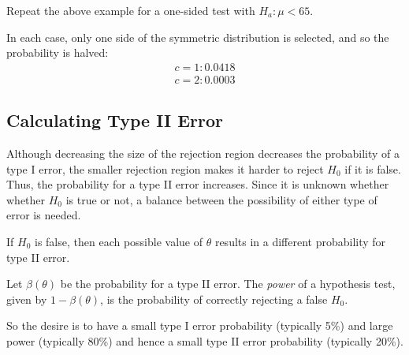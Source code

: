 \documentclass[letterpaper,12pt,fleqn]{article}
\renewcommand{\O}{\theta}
\newcommand{\m}{\mu}
\renewcommand{\b}{\beta}
\begin{document}
\begin{example}
  Repeat the above example for a one-sided test with \(H_a:\m<65\).

  In each case, only one side of the symmetric distribution is selected, and so the probability is halved:
  \begin{gather*}
    c=1 : 0.0418 \\
    c=2 : 0.0003
  \end{gather*}
\end{example}

\subsection*{Calculating Type II Error}

Although decreasing the size of the rejection region decreases the probability of a type I error, the smaller rejection region
makes it harder to reject \(H_0\) if it is false.  Thus, the probability for a type II error increases.  Since it is unknown
whether whether \(H_0\) is true or not, a balance between the possibility of either type of error is needed.

If \(H_0\) is false, then each possible value of \(\O\) results in a different probability for type II error.

\begin{definition}[Power]
  Let \(\b(\O)\) be the probability for a type II error.  The \emph{power} of a hypothesis test, given by \(1-\b(\O)\), is
  the probability of correctly rejecting a false \(H_0\).
\end{definition}

So the desire is to have a small type I error probability (typically 5\%) and large power (typically 80\%) and hence a small
type II error probability (typically 20\%).
\end{document}

